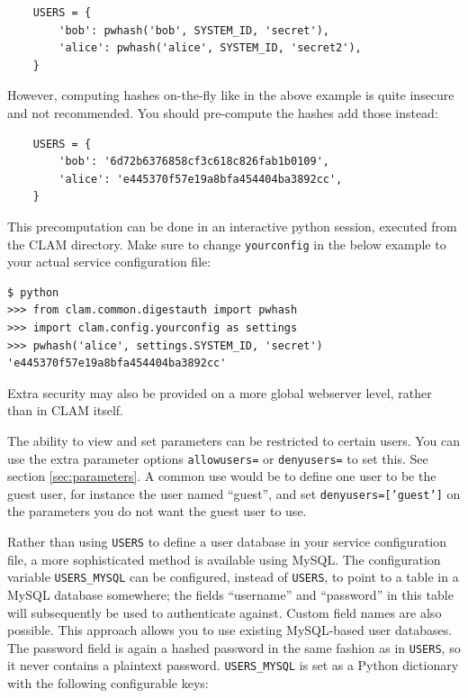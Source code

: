 \documentclass[a4paper,12pt]{report}
\begin{document}
\begin{verbatim}
    USERS = {
        'bob': pwhash('bob', SYSTEM_ID, 'secret'), 
		'alice': pwhash('alice', SYSTEM_ID, 'secret2'),
    }
\end{verbatim}

However, computing hashes on-the-fly like in the above example is quite
insecure and not recommended. You should pre-compute the hashes add those
instead:

\begin{verbatim}
    USERS = {
        'bob': '6d72b6376858cf3c618c826fab1b0109',
		'alice': 'e445370f57e19a8bfa454404ba3892cc',
    }
\end{verbatim}

This precomputation can be done in an interactive python session, executed from
the CLAM directory. Make sure to change \texttt{yourconfig} in the below
example to your actual service configuration file:

\begin{verbatim}
$ python
>>> from clam.common.digestauth import pwhash
>>> import clam.config.yourconfig as settings
>>> pwhash('alice', settings.SYSTEM_ID, 'secret')
'e445370f57e19a8bfa454404ba3892cc'
\end{verbatim}


Extra security may also be provided on a more global webserver level, rather than in CLAM itself.

The ability to view and set parameters can be restricted to certain users. You
can use the extra parameter options \texttt{allowusers=} or \texttt{denyusers=}
to set this. See section \ref{sec:parameters}. A common use would be to define
one user to be the guest user, for instance the user named ``guest'', and set
\texttt{denyusers=['guest']} on the parameters you do not want the guest user
to use.

Rather than using \texttt{USERS} to define a user database in your service
configuration file, a more sophisticated method is available using MySQL. The
configuration variable \texttt{USERS\_MYSQL} can be configured, instead of
\texttt{USERS}, to point to a table in a MySQL database somewhere; the fields
``username'' and ``password'' in this table will subsequently be used to
authenticate against. Custom field names are also possible. This approach
allows you to use existing MySQL-based user databases. The password field is
again a hashed password in the same fashion as in \texttt{USERS}, so it never
contains a plaintext password. \texttt{USERS\_MYSQL} is set as a Python
dictionary with the following configurable keys:
\end{document}
